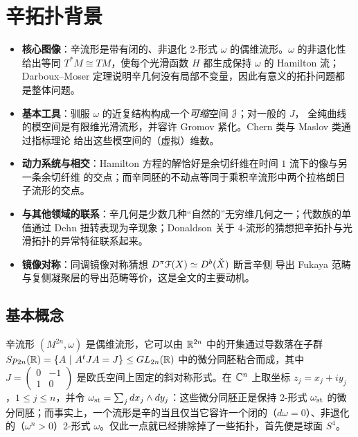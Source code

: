 
\section{辛拓扑背景}\label{Sec:Symplectic}

\begin{keypoints}
\begin{itemize}
  \item \textbf{核心图像}：辛流形是带有闭的、非退化 2-形式 $\omega$ 的偶维流形。$\omega$ 的非退化性
        给出等同 $T^*M \cong TM$，使每个光滑函数 $H$ 都生成保持 $\omega$ 的 Hamilton 流；
        Darboux--Moser 定理说明辛几何没有局部不变量，因此有意义的拓扑问题都是整体问题。
  \item \textbf{基本工具}：驯服 $\omega$ 的近复结构构成一个\emph{可缩}空间 $\EuScript{J}$；对一般的 $J$，
        全纯曲线的模空间是有限维光滑流形，并容许 Gromov 紧化。Chern 类与 Maslov 类通过指标理论
        给出这些模空间的（虚拟）维数。
  \item \textbf{动力系统与相交}：Hamilton 方程的解恰好是余切纤维在时间 $1$ 流下的像与另一条余切纤维
        的交点；而辛同胚的不动点等同于乘积辛流形中两个拉格朗日子流形的交点。
  \item \textbf{与其他领域的联系}：辛几何是少数几种“自然的”无穷维几何之一；代数族的单值通过
        Dehn 扭转表现为辛现象；Donaldson 关于 4-流形的猜想把辛拓扑与光滑拓扑的异常特征联系起来。
  \item \textbf{镜像对称}：同调镜像对称猜想 $D^{\pi}\EuScript{F}(X) \simeq D^b(\check{X})$ 断言辛侧
        导出 Fukaya 范畴与复侧凝聚层的导出范畴等价，这是全文的主要动机。
\end{itemize}
\end{keypoints}

\subsection{基本概念}

辛流形 $(M^{2n},\omega)$ 是偶维流形，它可以由 $\mathbb{R}^{2n}$ 中的开集通过导数落在子群 $Sp_{2n}(\mathbb{R}) = \left\{A \ | \ A^t J A = J \right\} \leq GL_{2n}(\mathbb{R})$ 中的微分同胚粘合而成，其中 $J = \left(\begin{array}{cc} 0 & -1 \\ 1 & 0 \end{array} \right)$ 是欧氏空间上固定的斜对称形式。在 $\mathbb{C}^n$ 上取坐标 $z_j = x_j + iy_j$，$1\leq j \leq n$，并令 $\omega_{\operatorname{st}} = \sum_j dx_j \wedge dy_j$：这些微分同胚正是保持 2-形式 $\omega_{\operatorname{st}}$ 的微分同胚；而事实上，一个流形是辛的当且仅当它容许一个闭的（$d\omega = 0$）、非退化的（$\omega^n > 0$）2-形式 $\omega$。仅此一点就已经排除掉了一些拓扑，首先便是球面 $S^4$。

